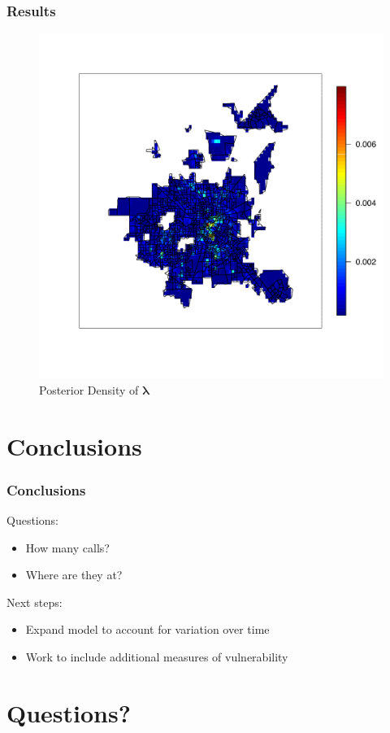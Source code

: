 \documentclass[10pt, compress]{beamer}
\begin{document}
  \begin{frame}
    \frametitle{Results}
   \centering
    \begin{figure}
      \caption{Posterior Density of $\boldsymbol\lambda$}
      \includegraphics[height=0.7\textheight]{posteriorLocationDensity.pdf}
    \end{figure}
  \end{frame}
  \section{Conclusions}
  \begin{frame}
    \frametitle{Conclusions}
    Questions:
    \begin{itemize}
      \item How many calls?
      \item Where are they at?
    \end{itemize}
    Next steps:
    \begin{itemize}
      \item Expand model to account for variation over time
      \item Work to include additional measures of vulnerability
    \end{itemize}
  \end{frame}
  \section{Questions?}
\end{document}
